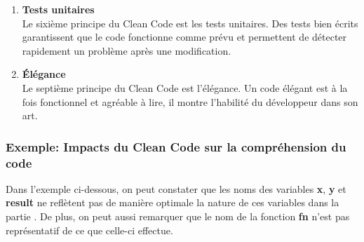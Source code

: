 \documentclass{rapport}
\begin{document}
\begin{enumerate}[listparindent=0pt, parsep=0pt]
    \item \textbf{Tests unitaires}\\
    Le sixième principe du Clean Code est les tests unitaires. Des tests bien écrits garantissent que le code fonctionne comme prévu et permettent de détecter rapidement un problème après une modification.\\

    \item \textbf{Élégance} \\
    Le septième principe du Clean Code est l'élégance. Un code élégant est à la fois fonctionnel et agréable à lire, il montre l'habilité du développeur dans son art.\\
\end{enumerate}

\subsubsection{Exemple: Impacts du Clean Code sur la compréhension du code}
Dans l'exemple ci-dessous, on peut constater que les noms des variables \textbf{x}, \textbf{y} et\\ \textbf{result} ne reflètent pas de manière optimale la nature de ces variables dans la partie . De plus, on peut aussi remarquer que le nom de la fonction \textbf{fn} n'est pas représentatif de ce que celle-ci effectue.\\
\end{document}
